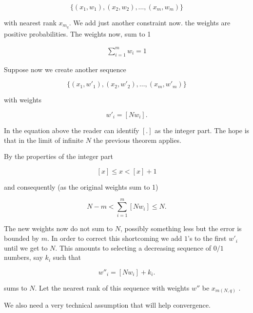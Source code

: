 \documentclass[a4paper,11pt]{article} %
\theoremstyle{definition}
\theoremstyle{remark}
\begin{document}
\begin{equation}
\label{nonintegralseq}
\{(x_{1},w_{1}), (x_{2},w_{2}),\ldots, (x_{m}, w_{m})\}
\end{equation}

with nearest rank $x_{m_{q}}$. We add just another constraint now. the weights are positive probabilities. The weights now, sum to 1

\begin{align}
\sum_{i=1}^{m} w_{i} = 1
\end{align}

Suppose now we create another sequence 

\begin{equation}
\label{nonintegralseq}
\{(x_{1},w'_{1}), (x_{2},w'_{2}),\ldots, (x_{m}, w'_{m})\}
\end{equation}

with weights

\begin{equation}
\label{newweights}
w'_{i} = [N w_{i}] .
\end{equation}

In the equation above the reader can identify $[.]$ as the integer part. The hope is that in the limit of infinite $N$ the previous theorem applies.

By the properties of the integer part

\begin{equation}
\label{ineqintegral}
[x] \le x < [x] +1
\end{equation}

and consequently (as the original weights sum to 1)

\begin{equation*}
N -m < \sum_{i=1}^{m} [N w_{i} ]  \le N.
\end{equation*}

The new weights now do not sum to $N$, possibly something less but the error is bounded by $m$.  In order to correct this shortcoming we add $1$'s to the first $w'_{i}$ until we get to $N$. This amounts to selecting a decreasing sequence of $0/1$ numbers, say $k_{i}$ such that

\begin{equation}
\label{newweights}
w''_{i} = [N w_{i}] + k_{i} .
\end{equation}

sums to $N$. Let the nearest rank of this sequence with weights $w''$ be $x_{m(N,q)}$ . 

We also need a very technical assumption that will help convergence.
\end{document}
